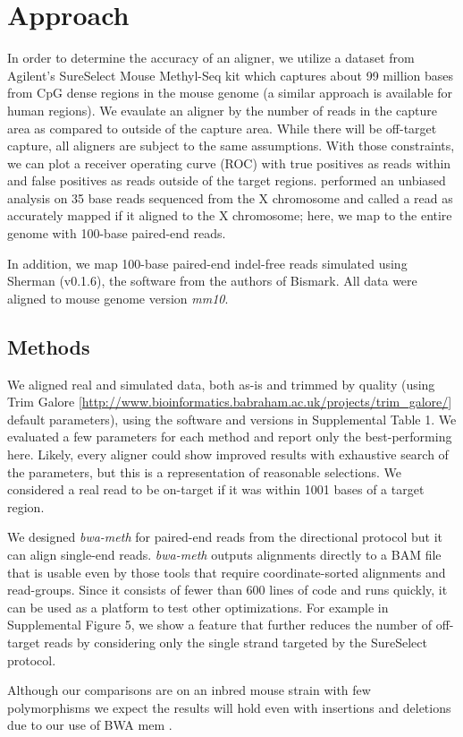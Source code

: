 \documentclass{bioinfo}
\begin{document}
\section{Approach}
In order to determine the accuracy of an aligner,
we utilize a dataset from Agilent's SureSelect Mouse Methyl-Seq kit which
captures about
99 million bases from CpG dense regions in the mouse genome (a similar
approach is available for human regions).
We evaulate an aligner by the number of reads in the capture area as compared
to outside of the capture area. While there will be off-target capture, all
aligners are subject to the same assumptions. With those constraints, we can
plot a receiver operating curve (ROC) with true positives as reads within
and false positives as reads outside of the target regions.
\citealp{shrestha} performed an unbiased analysis on 35 base reads sequenced from
the X chromosome and called a read as accurately mapped if it aligned
to the X chromosome; here, we map to the entire genome with 100-base paired-end reads.

In addition, we map 100-base paired-end indel-free reads simulated using
Sherman (v0.1.6), the software from the authors of Bismark. All data were
aligned to mouse genome version \textit{mm10}.

\begin{methods}
\section{Methods}
We aligned real and simulated data, both as-is and trimmed by quality (using Trim Galore
[\href{http://www.bioinformatics.babraham.ac.uk/projects/trim\_galore/}{http://www.bioinformatics.babraham.ac.uk/projects/trim\_galore/}]
default parameters), using the software and versions in Supplemental Table 1.
We evaluated a few parameters for each method and report only the
best-performing here. Likely, every aligner could show improved results with
exhaustive search of the parameters, but this is a representation of
reasonable selections.
We considered a real read to be on-target if it was within 1001 bases
of a target region.

We designed \textit{bwa-meth} for paired-end reads from the directional
protocol but it can align single-end reads. \textit{bwa-meth} outputs alignments
directly to a BAM file that is usable even by those tools that require
coordinate-sorted alignments and read-groups. Since it consists
of fewer than 600 lines of code and runs
quickly, it can be used as a platform to test other optimizations. For example
in Supplemental Figure 5, we show a feature that further reduces the
number of off-target reads by considering only the single strand targeted by
the SureSelect protocol.

Although our comparisons are on an inbred mouse strain with few polymorphisms
we expect the results will hold even with insertions and deletions due to
our use of BWA mem \citep{bwamem}.

\end{methods}
\end{document}
